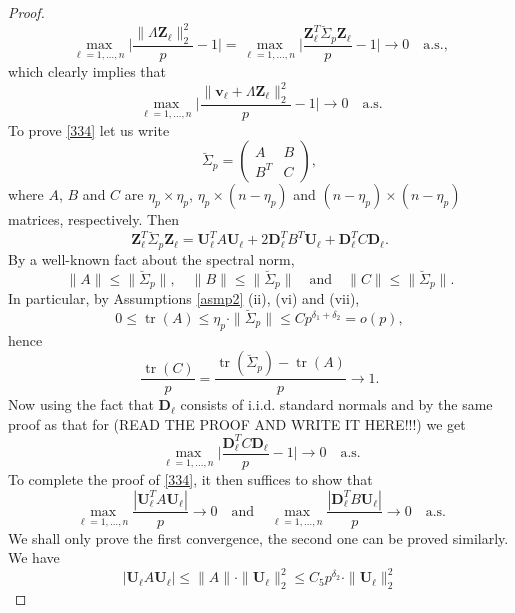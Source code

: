 \documentclass[a4paper,11pt]{article}
\theoremstyle{plain}
\theoremstyle{definition}
\newcommand{\tr}{\operatorname{tr}}
\begin{document}
\begin{proof}
    	\begin{equation} \label{334}
    		\max_{\ell = 1, \dots, n} \Bigg|\frac{  \| \Lambda \mathbf{Z}_\ell \|_2^2}{p} - 1\Bigg| = \max_{\ell = 1, \dots, n} \Bigg| \frac{  \mathbf{Z}_\ell^T \breve{\Sigma}_p \mathbf{Z}_\ell}{p} - 1\Bigg| \rightarrow 0 \quad \text{a.s.},
    	\end{equation}
    	which clearly implies that
    	\begin{equation} \label{335}
    		\max_{\ell = 1, \dots, n} \Bigg|\frac{  \| \mathbf{v}_\ell + \Lambda\mathbf{Z}_\ell  \|_2^2}{p} - 1\Bigg| \rightarrow 0 \quad \text{a.s.}
    	\end{equation}
    	To prove \eqref{334} let us write
    	\[ \breve{\Sigma}_p = \begin{pmatrix}
    	A & B \\
    	B^T & C
    	\end{pmatrix}, \]
    	where $A$, $B$ and $C$ are $\eta_p \times \eta_p$, $\eta_p \times (n - \eta_p)$ and $(n-\eta_p) \times (n-\eta_p)$ matrices, respectively. Then
    	\[ \mathbf{Z}_\ell^T \breve{\Sigma}_p \mathbf{Z}_\ell = \mathbf{U}_\ell^T A \mathbf{U}_\ell + 2\mathbf{D}_\ell^T B^T \mathbf{U}_\ell + \mathbf{D}_\ell^T C \mathbf{D}_\ell.  \]    	
    	By a well-known fact about the spectral norm,
    	\[ \|A\| \leq \|\breve{\Sigma}_p \|, \quad \|B\| \leq \|\breve{\Sigma}_p \| \quad \text{and} \quad \|C\| \leq \|\breve{\Sigma}_p \|. \]
    	In particular, by Assumptions \ref{asmp2} (ii), (vi) and (vii),
    	\[ 0 \leq \tr(A) \leq \eta_p \cdot \|\breve{\Sigma}_p \| \leq Cp^{\delta_1 + \delta_2} = o(p), \]
    	hence 
    	\[ \frac{\tr(C)}{p} = \frac{\tr(\breve{\Sigma}_p)-\tr(A)}{p} \rightarrow 1. \]
    	Now using the fact that $\mathbf{D}_\ell$ consists of i.i.d. standard normals and by the same proof as that for (READ THE PROOF AND WRITE IT HERE!!!)
    	we get
    	\[ \max_{\ell = 1, \dots, n} \Bigg| \frac{\mathbf{D}_\ell^T C \mathbf{D}_\ell}{p} - 1 \Bigg| \rightarrow 0 \quad \text{a.s.} \]
    	To complete the proof of \eqref{334}, it then suffices to show that
    	\[ \max_{\ell = 1, \dots, n} \frac{| \mathbf{U}_\ell^T A \mathbf{U}_\ell |}{p} \rightarrow 0 \quad \text{and} \quad \max_{\ell = 1, \dots, n} \frac{| \mathbf{D}_\ell^T B \mathbf{U}_\ell |}{p} \rightarrow 0 \quad \text{a.s.} \]
    	We shall only prove the first convergence, the second one can be proved similarly. We have
    	\begin{equation} \label{337}
    		|\mathbf{U}_\ell A \mathbf{U}_\ell| \leq \|A\| \cdot \|\mathbf{U}_\ell\|_2^2 \leq C_5 p^{\delta_2} \cdot \|\mathbf{U}_\ell\|_2^2

\end{equation}
\end{proof}
\end{document}
